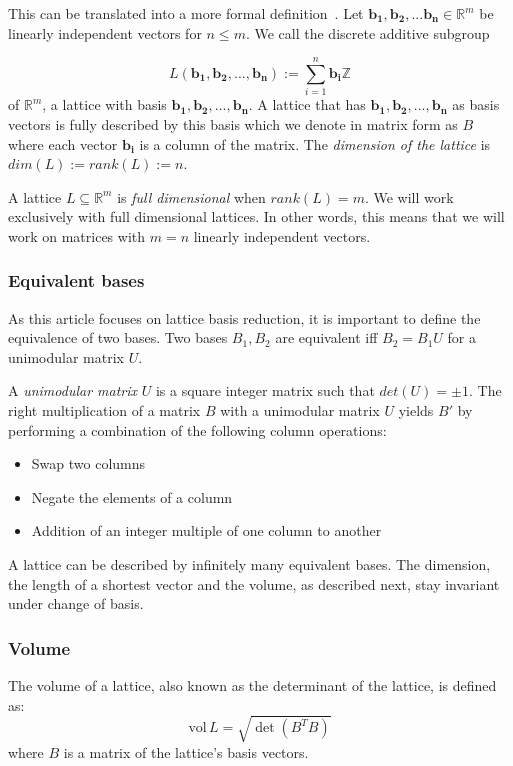 \documentclass[10pt, a4paper]{article}
\renewcommand{\vec}[1]{\mathbf{#1}}
\begin{document}
This can be translated into a more formal definition~\cite{SchnorrStanfordNotes}.\newline 
Let $\vec{b_1}, \vec{b_2}, ... \vec{b_n} \in \mathbb{R}^m$ be linearly independent vectors for $n\leq m$. We call the discrete additive subgroup

\[
L(\vec{b_1}, \vec{b_2},..., \vec{b_n}):= \displaystyle\sum_{i=1}^{n} \vec{b_i} \mathbb{Z}
\] of $\mathbb{R}^m$, a lattice with basis $\vec{b_1,b_2,...,b_n}$.
A lattice that has $\vec{b_1},\vec{b_2},...,\vec{b_n}$ as basis vectors is fully described by this basis which we denote in matrix form as $B$ where each vector $\vec{b_i}$ is a column of the matrix.
The \emph{dimension of the lattice} is $dim(L) := rank(L) := n$.

A lattice $L \subseteq \mathbb{R}^m$ is \emph{full dimensional} when $rank(L)=m$. We will work exclusively with full dimensional lattices. In other words, this means that we will work on matrices with $m=n$ linearly independent vectors.

\subsubsection{Equivalent bases}

As this article focuses on lattice basis reduction, it is important to define the equivalence of two bases. Two bases $B_1 , B_2$ are equivalent iff $B_2 = B_1 U$ for a unimodular matrix $U$.

A \emph{unimodular matrix} $U$ is a square integer matrix such that $det(U) = \pm 1$. The right multiplication of a matrix $B$ with a unimodular matrix $U$ yields $B'$ by performing a combination of the following column operations:
\begin{itemize}
\item Swap two columns
\item Negate the elements of a column
\item Addition of an integer multiple of one column to another
\end{itemize}

A lattice can be described by infinitely many equivalent bases. The dimension, the length of a shortest vector and the volume, as described next, stay invariant under change of basis.
\subsubsection{Volume}

The volume of a lattice, also known as the determinant of the lattice, is defined as:
\[
\text{vol} \,L = \sqrt{\det(B^T B)}
\] where $B$ is a matrix of the lattice's basis vectors.
\end{document}

